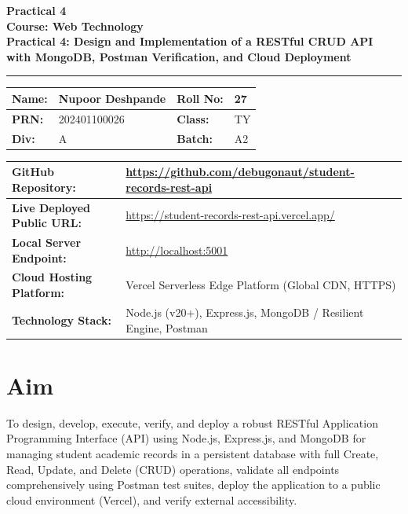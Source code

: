 \documentclass[11pt,a4paper]{article}
\begin{document}
\begin{center}
    {\LARGE \textbf{Practical 4}}\\[0.3cm]
    {\large \textbf{Course: Web Technology}}\\[0.2cm]
    \textbf{Practical 4: Design and Implementation of a RESTful CRUD API with MongoDB, Postman Verification, and Cloud Deployment}\\[0.1cm]
    \rule{\textwidth}{1pt}
\end{center}

\vspace{0.2cm}

\begin{center}
\renewcommand{\arraystretch}{1.4}
\begin{tabular}{|l|p{5.5cm}|l|p{4cm}|}
\hline
\textbf{Name:} & Nupoor Deshpande & \textbf{Roll No:} & 27 \\ \hline
\textbf{PRN:} & 202401100026 & \textbf{Class:} & TY \\ \hline
\textbf{Div:} & A & \textbf{Batch:} & A2 \\ \hline
\end{tabular}
\end{center}

\vspace{0.2cm}

\begin{center}
\renewcommand{\arraystretch}{1.3}
\begin{tabularx}{\textwidth}{|l|X|}
\hline
\textbf{GitHub Repository:} & \url{https://github.com/debugonaut/student-records-rest-api} \\ \hline
\textbf{Live Deployed Public URL:} & \url{https://student-records-rest-api.vercel.app/} \\ \hline
\textbf{Local Server Endpoint:} & \url{http://localhost:5001} \\ \hline
\textbf{Cloud Hosting Platform:} & Vercel Serverless Edge Platform (Global CDN, HTTPS) \\ \hline
\textbf{Technology Stack:} & Node.js (v20+), Express.js, MongoDB / Resilient Engine, Postman \\ \hline
\end{tabularx}
\end{center}

\vspace{0.3cm}

\section{Aim}
To design, develop, execute, verify, and deploy a robust RESTful Application Programming Interface (API) using Node.js, Express.js, and MongoDB for managing student academic records in a persistent database with full Create, Read, Update, and Delete (CRUD) operations, validate all endpoints comprehensively using Postman test suites, deploy the application to a public cloud environment (Vercel), and verify external accessibility.
\end{document}
